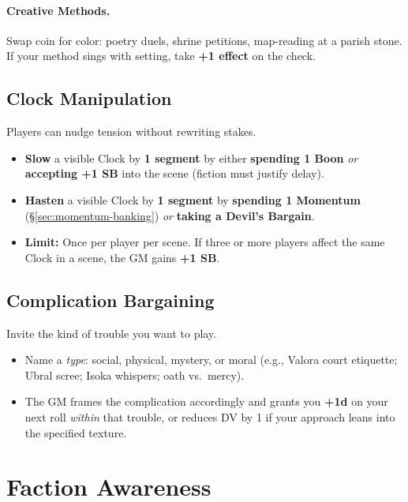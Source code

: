 \begin{multicols}{2}
\paragraph{Creative Methods.}
Swap coin for color: poetry duels, shrine petitions, map-reading at a parish stone. If your method sings with setting, take \textbf{+1 effect} on the check.%

\subsection{Clock Manipulation}
\label{sec:clock-manip}

Players can nudge tension without rewriting stakes.
\begin{itemize}
  \item \textbf{Slow} a visible Clock by \textbf{1 segment} by either \textbf{spending 1 Boon} \emph{or} \textbf{accepting +1 SB} into the scene (fiction must justify delay).
  \item \textbf{Hasten} a visible Clock by \textbf{1 segment} by \textbf{spending 1 Momentum} (\S\ref{sec:momentum-banking}) \emph{or} \textbf{taking a Devil’s Bargain}. 
  \item \textbf{Limit:} Once per player per scene. If three or more players affect the same Clock in a scene, the GM gains \textbf{+1 SB}.
\end{itemize}

\subsection{Complication Bargaining}

Invite the kind of trouble you want to play.
\begin{itemize}
  \item Name a \emph{type}: social, physical, mystery, or moral (e.g., Valora court etiquette; Ubral scree; Isoka whispers; oath vs.\ mercy).
  \item The GM frames the complication accordingly and grants you \textbf{+1d} on your next roll \emph{within} that trouble, or reduces DV by 1 if your approach leans into the specified texture.
\end{itemize}

\section{Faction Awareness}


\end{multicols}
